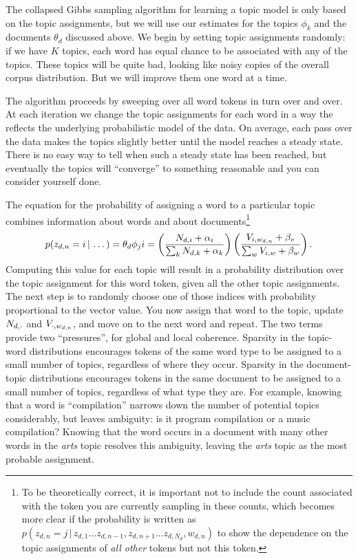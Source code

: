 The collapsed Gibbs sampling algorithm for learning a topic model is
only based on the topic assignments, but we will use our estimates for
the topics $\phi_k$ and the documents $\theta_d$ discussed above.  We
begin by setting topic assignments randomly: if we have $K$ topics,
each word has equal chance to be associated with any of the topics.
These topics will be quite bad, looking like noisy copies of the
overall corpus distribution. But we will improve them one word at a
time.

The algorithm proceeds by sweeping over all word tokens in turn over and over.
At each iteration we change the topic assignments for each word in a way the reflects the
underlying probabilistic model of the data.  On average, each pass over the data makes the
topics slightly better until the model reaches a steady state.  There is no easy way
to tell when such a steady state has been reached, but eventually the topics will ``converge'' to something reasonable and you can consider yourself done.

The equation for the probability of assigning a word to a particular topic
combines information about words and about documents\footnote{To be theoretically correct, it is important
not to include the count associated with the token you are currently sampling in
these counts, which becomes more clear if the probability is written as
$p(z_{d,n}=j\,|\,z_{d,1}\dots z_{d,n-1},z_{d,n+1}\dots z_{d,N_d}, w_{d,n})$ to
show the dependence on the topic assignments of \emph{all other} tokens but not
this token.}
\begin{align}
p(z_{d,n}=i \, | \, \dots) = \theta_d
\phi_ji= \left(\frac{N_{d,i} + \alpha_i}{\sum_k N_{d,k} + \alpha_k} \right) \left( \frac{V_{i,w_{d,n}} + \beta_v}{\sum_w V_{i,w} +
    \beta_w} \right).
\label{eq:sampling}
\end{align}
Computing this value for each topic will result in a probability distribution over the topic assignment for this word token, given all the other topic assignments.  The next step is to randomly choose one of those indices with
probability proportional to the vector value.  You now assign that word to the
topic, update $N_{d,\cdot}$ and $V_{\cdot,w_{d,n}}$, and move on to the next word and repeat.
The two terms provide two ``pressures'', for global and local coherence. Sparsity in the topic-word distributions encourages tokens of the same word type to be assigned to a small number of topics,  regardless of where they occur. Sparsity in the document-topic distributions encourages tokens in the same document to be assigned to a small number of topics, regardless of what type they are.
For example, knowing that a word is ``compilation'' narrows down the number of potential topics considerably, but leaves ambiguity: is it program compilation or a music compilation? Knowing that the word occurs in a document with many other words in the \emph{arts} topic resolves this ambiguity, leaving the \emph{arts} topic as the most probable assignment.

